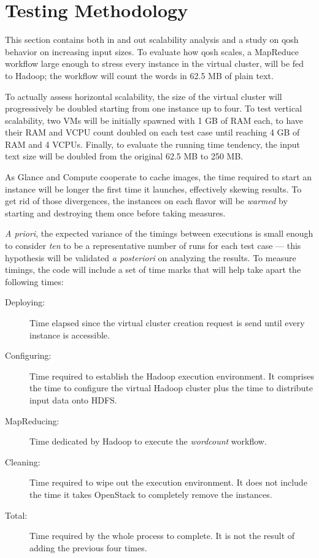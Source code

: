 \section{Testing Methodology}\label{sec:metodologiaprueba}
\noindent This section contains both in and out scalability analysis and a study on qosh behavior on increasing input sizes. To evaluate how qosh scales, a MapReduce workflow large enough to stress every instance in the virtual cluster, will be fed to Hadoop; the workflow will count the words in 62.5 MB of plain text.

To actually assess horizontal scalability, the size of the virtual cluster will progressively be doubled starting from one instance up to four. To test vertical scalability, two VMs will be initially spawned with 1 GB of RAM each, to have their RAM and VCPU count doubled on each test case until reaching 4 GB of RAM and 4 VCPUs. Finally, to evaluate the running time tendency, the input text size will be doubled from the original 62.5 MB to 250 MB.

As Glance and Compute cooperate to cache images, the time required to start an instance will be longer the first time it launches, effectively skewing results. To get rid of those divergences, the instances on each flavor will be \emph{warmed} by starting and destroying them once before taking measures.

\emph{A priori}, the expected variance of the timings between executions is small enough to consider \emph{ten} to be a representative number of runs for each test case --- this hypothesis will be validated \emph{a posteriori} on analyzing the results. To measure timings, the code will include a set of time marks that will help take apart the following times:

\begin{description}
    \item[Deploying:] Time elapsed since the virtual cluster creation request is send until every instance is accessible.
    \item[Configuring:] Time required to establish the Hadoop execution environment. It comprises the time to configure the virtual Hadoop cluster plus the time to distribute input data onto HDFS.
    \item[MapReducing:] Time dedicated by Hadoop to execute the \emph{wordcount} workflow.
    \item[Cleaning:] Time required to wipe out the execution environment. It does not include the time it takes OpenStack to completely remove the instances.
    \item[Total:] Time required by the whole process to complete. It is not the result of adding the previous four times.
\end{description}

